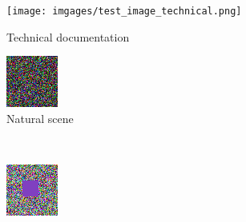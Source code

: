 \documentclass[11pt,a4paper]{article}
\begin{document}
\begin{figure}[htbp]
\centering
\begin{subfigure}{0.45\textwidth}
\texttt{[image: imgages/test\_image\_technical.png]}
\caption{Technical documentation}
\end{subfigure}
\hfill
\begin{subfigure}{0.45\textwidth}
\includegraphics[width=\textwidth]{images/test_image_natural.png}
\caption{Natural scene}
\end{subfigure}
\\
\begin{subfigure}{0.45\textwidth}
\includegraphics[width=\textwidth]{images/test_image_mixed.png}

\end{subfigure}
\end{figure}
\end{document}
